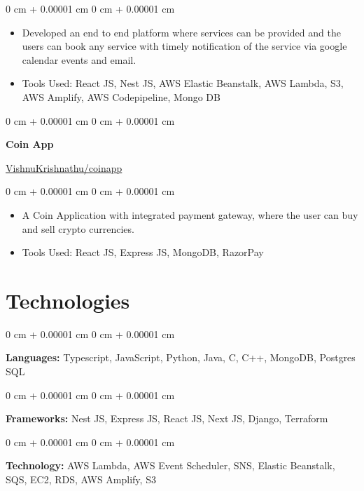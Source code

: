 \documentclass[10pt, letterpaper]{article}
\newenvironment{highlights}{
    \begin{itemize}[
        topsep=0.10 cm,
        parsep=0.10 cm,
        partopsep=0pt,
        itemsep=0pt,
        leftmargin=0 cm + 10pt
    ]
}{
    \end{itemize}
} %
\newenvironment{onecolentry}{
    \begin{adjustwidth}{
        0 cm + 0.00001 cm
    }{
        0 cm + 0.00001 cm
    }
}{
    \end{adjustwidth}
} %
\newenvironment{twocolentry}[2][]{
    \onecolentry
    \def\secondColumn{#2}
    \setcolumnwidth{\fill, 4.5 cm}
    \begin{paracol}{2}
}{
    \switchcolumn \raggedleft \secondColumn
    \end{paracol}
    \endonecolentry
} %
\begin{document}
        \vspace{0.10 cm}
        \begin{onecolentry}
            \begin{highlights}
                \item Developed an end to end platform where services can be provided and the users can book any service with timely notification of the service via google calendar events and email.
                \item Tools Used: React JS, Nest JS, AWS Elastic Beanstalk, AWS Lambda, S3, AWS Amplify, AWS Codepipeline, Mongo DB
            \end{highlights}
        \end{onecolentry}


        \vspace{0.2 cm}

        \begin{twocolentry}{
            \href{https://vishnukrishnathu.github.io/coinapp/}{VishnuKrishnathu/coinapp}
        }
            \textbf{Coin App}
        \end{twocolentry}

        \vspace{0.10 cm}
        \begin{onecolentry}
            \begin{highlights}
                \item A Coin Application with integrated payment gateway, where the user can buy and sell crypto currencies.
                \item Tools Used: React JS, Express JS, MongoDB, RazorPay
            \end{highlights}
        \end{onecolentry}


        \vspace{0.2 cm}
    
    \section{Technologies}



        
        \begin{onecolentry}
            \textbf{Languages:} Typescript, JavaScript, Python, Java, C, C++, MongoDB, Postgres SQL
        \end{onecolentry}

        \vspace{0.2 cm}

        \begin{onecolentry}
            \textbf{Frameworks:} Nest JS, Express JS, React JS, Next JS, Django, Terraform
        \end{onecolentry}
        \vspace{0.2 cm}
        \begin{onecolentry}
            \textbf{Technology:} AWS Lambda, AWS Event Scheduler, SNS, Elastic Beanstalk, SQS, EC2, RDS, AWS Amplify, S3
        \end{onecolentry}

    
\end{document}
